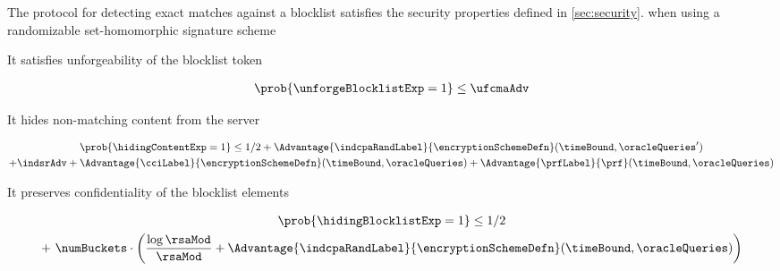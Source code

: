 \begin{theorem}
	
	The protocol \protocolEMP for detecting exact matches against a blocklist satisfies the security properties defined in \ref{sec:security}.
when using a randomizable set-homomorphic signature scheme \ourSigSchemeDefn 

\enumListStart
	
	\item It satisfies unforgeability of the blocklist token 
	\begin{small}
	\begin{gather*}
    \prob{\unforgeBlocklistExp = 1} \le \ufcmaAdv
\end{gather*}
	\end{small}
	
	\item It hides non-matching content from the server 
	
	\begin{small}
					\begin{gather*}
			\prob{\hidingContentExp = 1} \le 1/2 + \Advantage{\indcpaRandLabel}{\encryptionSchemeDefn}(\timeBound, 
		\oracleQueries') \\  + \indsrAdv +  \Advantage{\cciLabel}{\encryptionSchemeDefn}(\timeBound, \oracleQueries)  +  \Advantage{\prfLabel}{\prf}(\timeBound, \oracleQueries)
		\end{gather*}
		\end{small}
	
	\item It preserves confidentiality of the blocklist elements
	
	\begin{small}
				\begin{gather*}
				\prob{\hidingBlocklistExp = 1} \le 1/2  \\ + ~\numBuckets \cdot \left(\frac{\log \rsaMod}{\rsaMod} + \Advantage{\indcpaRandLabel}{\encryptionSchemeDefn}(\timeBound, \oracleQueries)\right)
			\end{gather*}
		\end{small}
	
	\enumListEnd  




\end{theorem}

